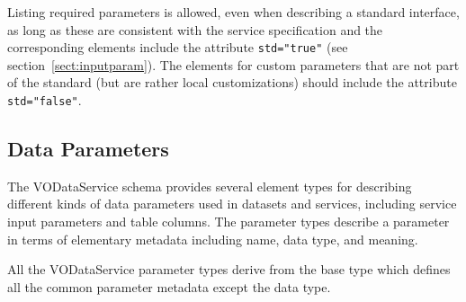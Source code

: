 \documentclass[11pt,a4paper]{ivoa}
\begin{document}
Listing required parameters is allowed, even when
describing a standard interface, as long as these are consistent with
the service specification and the corresponding 
elements include the attribute \verb|std="true"| (see
section~\ref{sect:inputparam}).  The 
elements for custom parameters that are not part of the standard (but
are rather local customizations) should include the attribute
\verb|std="false"|.





\subsection{Data Parameters}
\label{sect:param}


The VODataService schema provides several element types for describing
different kinds of data parameters used in datasets and services,
including service input parameters and table columns.  The parameter
types describe a parameter in terms of elementary metadata
including name, data type, and meaning.


All the VODataService parameter types derive from the base type
 which defines all the common parameter
metadata except the data type.
\end{document}
